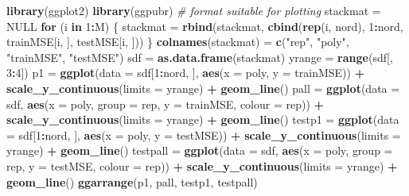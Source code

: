\documentclass[]{article}
\newenvironment{Shaded}{\begin{snugshade}}{\end{snugshade}}
\newcommand{\KeywordTok}[1]{\textcolor[rgb]{0.13,0.29,0.53}{\textbf{#1}}}
\newcommand{\DataTypeTok}[1]{\textcolor[rgb]{0.13,0.29,0.53}{#1}}
\newcommand{\DecValTok}[1]{\textcolor[rgb]{0.00,0.00,0.81}{#1}}
\newcommand{\StringTok}[1]{\textcolor[rgb]{0.31,0.60,0.02}{#1}}
\newcommand{\CommentTok}[1]{\textcolor[rgb]{0.56,0.35,0.01}{\textit{#1}}}
\newcommand{\OtherTok}[1]{\textcolor[rgb]{0.56,0.35,0.01}{#1}}
\newcommand{\ControlFlowTok}[1]{\textcolor[rgb]{0.13,0.29,0.53}{\textbf{#1}}}
\newcommand{\OperatorTok}[1]{\textcolor[rgb]{0.81,0.36,0.00}{\textbf{#1}}}
\newcommand{\NormalTok}[1]{#1}
\begin{document}
\begin{Shaded}
\begin{Highlighting}[]
\KeywordTok{library}\NormalTok{(ggplot2)}
\KeywordTok{library}\NormalTok{(ggpubr)}
\CommentTok{# format suitable for plotting}
\NormalTok{stackmat =}\StringTok{ }\OtherTok{NULL}
\ControlFlowTok{for}\NormalTok{ (i }\ControlFlowTok{in} \DecValTok{1}\OperatorTok{:}\NormalTok{M) \{}
\NormalTok{    stackmat =}\StringTok{ }\KeywordTok{rbind}\NormalTok{(stackmat, }\KeywordTok{cbind}\NormalTok{(}\KeywordTok{rep}\NormalTok{(i, nord), }\DecValTok{1}\OperatorTok{:}\NormalTok{nord, trainMSE[i, }
\NormalTok{        ], testMSE[i, ]))}
\NormalTok{\}}
\KeywordTok{colnames}\NormalTok{(stackmat) =}\StringTok{ }\KeywordTok{c}\NormalTok{(}\StringTok{"rep"}\NormalTok{, }\StringTok{"poly"}\NormalTok{, }\StringTok{"trainMSE"}\NormalTok{, }\StringTok{"testMSE"}\NormalTok{)}
\NormalTok{sdf =}\StringTok{ }\KeywordTok{as.data.frame}\NormalTok{(stackmat)}
\NormalTok{yrange =}\StringTok{ }\KeywordTok{range}\NormalTok{(sdf[, }\DecValTok{3}\OperatorTok{:}\DecValTok{4}\NormalTok{])}
\NormalTok{p1 =}\StringTok{ }\KeywordTok{ggplot}\NormalTok{(}\DataTypeTok{data =}\NormalTok{ sdf[}\DecValTok{1}\OperatorTok{:}\NormalTok{nord, ], }\KeywordTok{aes}\NormalTok{(}\DataTypeTok{x =}\NormalTok{ poly, }\DataTypeTok{y =}\NormalTok{ trainMSE)) }\OperatorTok{+}\StringTok{ }\KeywordTok{scale_y_continuous}\NormalTok{(}\DataTypeTok{limits =}\NormalTok{ yrange) }\OperatorTok{+}\StringTok{ }
\StringTok{    }\KeywordTok{geom_line}\NormalTok{()}
\NormalTok{pall =}\StringTok{ }\KeywordTok{ggplot}\NormalTok{(}\DataTypeTok{data =}\NormalTok{ sdf, }\KeywordTok{aes}\NormalTok{(}\DataTypeTok{x =}\NormalTok{ poly, }\DataTypeTok{group =}\NormalTok{ rep, }\DataTypeTok{y =}\NormalTok{ trainMSE, }\DataTypeTok{colour =}\NormalTok{ rep)) }\OperatorTok{+}\StringTok{ }
\StringTok{    }\KeywordTok{scale_y_continuous}\NormalTok{(}\DataTypeTok{limits =}\NormalTok{ yrange) }\OperatorTok{+}\StringTok{ }\KeywordTok{geom_line}\NormalTok{()}
\NormalTok{testp1 =}\StringTok{ }\KeywordTok{ggplot}\NormalTok{(}\DataTypeTok{data =}\NormalTok{ sdf[}\DecValTok{1}\OperatorTok{:}\NormalTok{nord, ], }\KeywordTok{aes}\NormalTok{(}\DataTypeTok{x =}\NormalTok{ poly, }\DataTypeTok{y =}\NormalTok{ testMSE)) }\OperatorTok{+}\StringTok{ }\KeywordTok{scale_y_continuous}\NormalTok{(}\DataTypeTok{limits =}\NormalTok{ yrange) }\OperatorTok{+}\StringTok{ }
\StringTok{    }\KeywordTok{geom_line}\NormalTok{()}
\NormalTok{testpall =}\StringTok{ }\KeywordTok{ggplot}\NormalTok{(}\DataTypeTok{data =}\NormalTok{ sdf, }\KeywordTok{aes}\NormalTok{(}\DataTypeTok{x =}\NormalTok{ poly, }\DataTypeTok{group =}\NormalTok{ rep, }\DataTypeTok{y =}\NormalTok{ testMSE, }
    \DataTypeTok{colour =}\NormalTok{ rep)) }\OperatorTok{+}\StringTok{ }\KeywordTok{scale_y_continuous}\NormalTok{(}\DataTypeTok{limits =}\NormalTok{ yrange) }\OperatorTok{+}\StringTok{ }\KeywordTok{geom_line}\NormalTok{()}
\KeywordTok{ggarrange}\NormalTok{(p1, pall, testp1, testpall)}
\end{Highlighting}
\end{Shaded}
\end{document}
